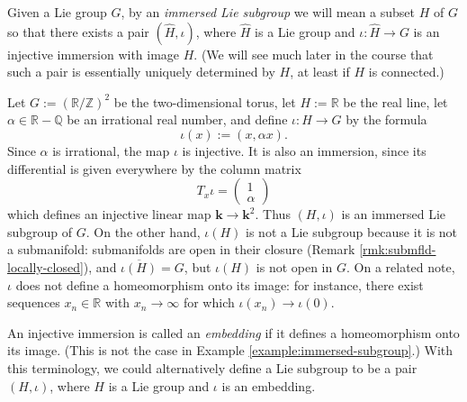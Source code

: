 \documentclass[reqno]{amsart} 
\begin{document}
\begin{definition}\label{defn:immersed-lie-subgroup}
  Given a Lie group $G$,
  by an \emph{immersed Lie subgroup}
  we will mean a subset $H$ of $G$
  so that there exists a pair
  $(\hat{H},\iota)$,
  where $\hat{H}$ is a Lie group
  and $\iota : \hat{H} \rightarrow G$ is an injective immersion
  with image $H$.
  (We will see much later in the course
  that such a pair is essentially uniquely
  determined by $H$, at least if $H$ is connected.)
\end{definition}
\begin{example}\label{example:immersed-subgroup}
  Let $G  := (\mathbb{R}/\mathbb{Z})^2$ be the two-dimensional
  torus,
  let $H := \mathbb{R}$ be the real line,
  let $\alpha \in \mathbb{R} - \mathbb{Q}$ be an irrational real
  number,
  and define $\iota : H \rightarrow G$
  by the formula
  \begin{equation*}
  \iota(x) := (x,\alpha x).
  \end{equation*}
  Since $\alpha$ is irrational, the map $\iota$ is injective.
  It is also an immersion, since its differential
  is given everywhere by the column matrix
  \begin{equation*}
  T_x \iota
  = 
\begin{pmatrix}
    1  \\
    \alpha 
  \end{pmatrix}
  \end{equation*}
  which defines an injective linear map $\mathbf{k}
  \rightarrow \mathbf{k}^2$.
  Thus $(H,\iota)$ is an immersed Lie subgroup of $G$.
  On the other hand, $\iota(H)$ is not a Lie subgroup
  because it is not a submanifold:
  submanifolds are open in their closure (Remark \ref{rmk:submfld-locally-closed}), 
  and $\overline{\iota(H)} = G$,
  but $\iota(H)$ is not open in $G$.
  On a related note, $\iota$ does not define a homeomorphism
  onto its image:
  for instance, there exist sequences $x_n \in \mathbb{R}$
  with $x_n \rightarrow \infty$ for which $\iota(x_n) \rightarrow \iota(0)$.
\end{example}

\begin{remark}
  An injective immersion
  is called an \emph{embedding} if it defines a homeomorphism
  onto its image.
  (This is not the case in Example \ref{example:immersed-subgroup}.)
  With this terminology, we could alternatively
  define a Lie subgroup
  to be a pair $(H,\iota)$,
  where $H$ is a Lie group
  and $\iota$ is an embedding.
\end{remark}
\end{document}
